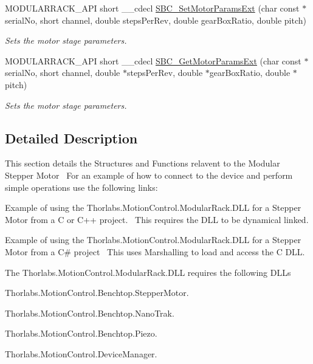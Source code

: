 \begin{DoxyCompactItemize}
M\+O\+D\+U\+L\+A\+R\+R\+A\+C\+K\+\_\+\+A\+PI short \+\_\+\+\_\+cdecl \hyperlink{group___modular_stepper_ga3d1cdfba1bb56528389452436f4d2566}{S\+B\+C\+\_\+\+Set\+Motor\+Params\+Ext} (char const $\ast$serial\+No, short channel, double steps\+Per\+Rev, double gear\+Box\+Ratio, double pitch)
\begin{DoxyCompactList}\small\item\em Sets the motor stage parameters. \end{DoxyCompactList}\item 
M\+O\+D\+U\+L\+A\+R\+R\+A\+C\+K\+\_\+\+A\+PI short \+\_\+\+\_\+cdecl \hyperlink{group___modular_stepper_gad8a39815a5cab6b1f88b481b1a5cd974}{S\+B\+C\+\_\+\+Get\+Motor\+Params\+Ext} (char const $\ast$serial\+No, short channel, double $\ast$steps\+Per\+Rev, double $\ast$gear\+Box\+Ratio, double $\ast$pitch)
\begin{DoxyCompactList}\small\item\em Sets the motor stage parameters. \end{DoxyCompactList}\end{DoxyCompactItemize}


\subsection{Detailed Description}
This section details the Structures and Functions relavent to the Modular Stepper Motor~\newline
 For an example of how to connect to the device and perform simple operations use the following links\+: 
\begin{DoxyItemize}
\item Example of using the Thorlabs.Motion\+Control.Modular\+Rack.D\+LL for a Stepper Motor from a C or C++ project.~\newline
 This requires the D\+LL to be dynamical linked.  
\item Example of using the Thorlabs.Motion\+Control.Modular\+Rack.D\+LL for a Stepper Motor from a C\# project~\newline
 This uses Marshalling to load and access the C D\+LL.  
\end{DoxyItemize}The Thorlabs.\+Motion\+Control.\+Modular\+Rack.\+D\+LL requires the following D\+L\+Ls 
\begin{DoxyItemize}
\item Thorlabs.\+Motion\+Control.\+Benchtop.\+Stepper\+Motor.  
\item Thorlabs.\+Motion\+Control.\+Benchtop.\+Nano\+Trak.  
\item Thorlabs.\+Motion\+Control.\+Benchtop.\+Piezo.  
\item Thorlabs.\+Motion\+Control.\+Device\+Manager.  
\end{DoxyItemize}

